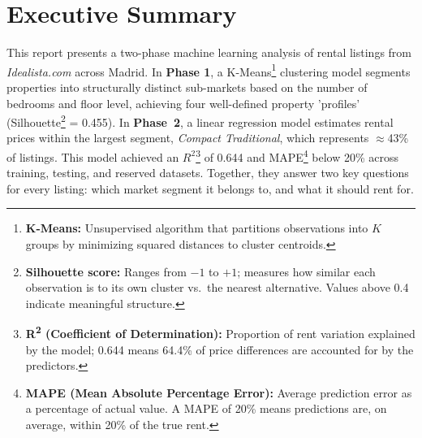 \documentclass[10pt,a4paper,twocolumn]{article}
\newcommand{\seg}[1]{\textit{#1}}          %
\begin{document}
\thispagestyle{empty}


\section*{Executive Summary}

This report presents a two-phase machine learning analysis of rental listings from \textit{Idealista.com} across Madrid. In \textbf{Phase 1}, a K-Means\footnote{\textbf{K-Means:} Unsupervised algorithm that partitions observations into $K$ groups by minimizing squared distances to cluster centroids.} clustering model segments properties into structurally distinct sub-markets based on the number of bedrooms and floor level, achieving four well-defined property 'profiles' (Silhouette\footnote{\textbf{Silhouette score:} Ranges from $-1$ to $+1$; measures how similar each observation is to its own cluster vs.\ the nearest alternative. Values above 0.4 indicate meaningful structure.} = 0.455). In \textbf{Phase~2}, a linear regression model estimates rental prices within the largest segment, \seg{Compact Traditional}, which represents $\approx$43\% of listings. This model achieved an $R^2$\footnote{\textbf{R\textsuperscript{2} (Coefficient of Determination):} Proportion of rent variation explained by the model; 0.644 means 64.4\% of price differences are accounted for by the predictors.} of 0.644 and MAPE\footnote{\textbf{MAPE (Mean Absolute Percentage Error):} Average prediction error as a percentage of actual value. A MAPE of 20\% means predictions are, on average, within 20\% of the true rent.} below 20\% across training, testing, and reserved datasets. Together, they answer two key questions for every listing: which market segment it belongs to, and what it should rent for.
\end{document}
